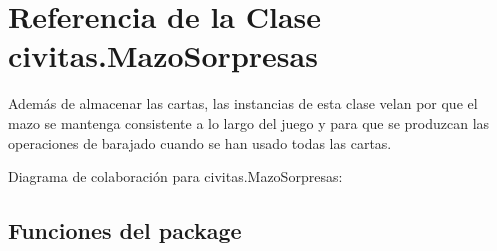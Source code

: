 \hypertarget{classcivitas_1_1MazoSorpresas}{}\section{Referencia de la Clase civitas.\+Mazo\+Sorpresas}
\label{classcivitas_1_1MazoSorpresas}


Además de almacenar las cartas, las instancias de esta clase velan por que el mazo se mantenga consistente a lo largo del juego y para que se produzcan las operaciones de barajado cuando se han usado todas las cartas.  




Diagrama de colaboración para civitas.\+Mazo\+Sorpresas\+:
\subsection*{Funciones del \textquotesingle{}package\textquotesingle{}}
